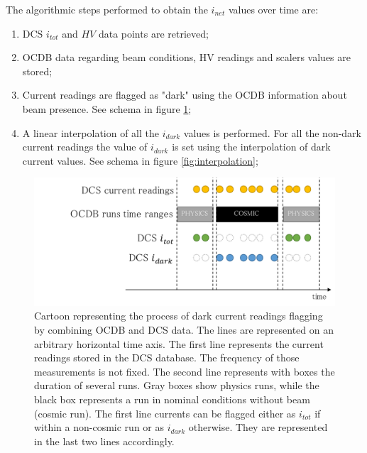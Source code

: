 The algorithmic steps performed to obtain the $i_{net}$ values over time are:
\begin{enumerate}
\item DCS $i_{tot}$ and $HV$ data points are retrieved;
\item OCDB data regarding beam conditions, HV readings and scalers values are stored;
\item Current readings are flagged as "dark" using the OCDB information about beam presence. See schema in figure \ref{fig:iDarkFlag};
\item A linear interpolation of all the $i_{dark}$ values is performed. 
For all the non-dark current readings the value of $i_{dark}$ is set using the interpolation of dark current values. See schema in figure \ref{fig:interpolation};
\end{enumerate}

\begin{figure}[!t]
\begin{center}
\includegraphics[width=0.8\linewidth]{Chapters/Performance/Figs/darkCurrentFlagging.pdf}
\caption{Cartoon representing the process of dark current readings flagging by combining OCDB and DCS data. The lines are represented on an arbitrary horizontal time axis. 
The first line represents the current readings stored in the DCS database. 
The frequency of those measurements is not fixed. 
The second line represents with boxes the duration of several runs. 
Gray boxes show physics runs, while the black box represents a run in nominal conditions without beam (cosmic run). 
The first line currents can be flagged either as $i_{tot}$ if within a non-cosmic run or as $i_{dark}$ otherwise. 
They are represented in the last two lines accordingly. }
\label{fig:iDarkFlag}
\end{center}
\end{figure}


